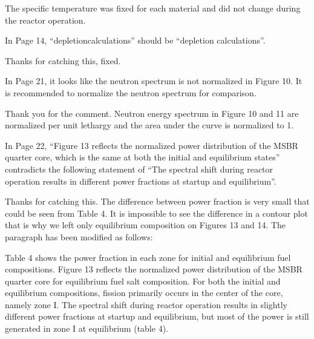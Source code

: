 \documentclass[answers,11pt]{exam}
\begin{document}
\begin{questions}
\begin{solution}
		        The specific temperature was fixed for each material and did 
		        not change during the reactor operation. 
        \end{solution}

        \question  In Page 14, ``depletioncalculations'' should be ``depletion 
        calculations''.
        \begin{solution}
                Thanks for catching this, fixed.
        \end{solution}

        \question  In Page 21, it looks like the neutron spectrum is not 
        normalized in Figure 10. It is recommended to normalize the neutron 
        spectrum for comparison.
        \begin{solution}
                Thank you for the comment. Neutron energy spectrum in Figure 
                10 and 11 are normalized per unit lethargy and the area under 
                the curve is normalized to 1.
        \end{solution}

        \question  In Page 22, ``Figure 13 reflects the normalized power 
        distribution of the MSBR quarter core, which is the same at both the 
        initial and equilibrium states'' contradicts the following statement of 
        ``The spectral shift during reactor operation results in different power 
        fractions at startup and equilibrium''.
        \begin{solution}
                Thanks for catching this. The difference between power fraction
                 is very small that could be seen from Table 4. It is impossible
                  to see the difference in a contour plot that is why we left only 
                 equilibrium composition on Figures 13 and 14. The paragraph has 
                 been modified as follows:
                 
                 Table 4 shows the power fraction in each zone for initial and 
                 equilibrium fuel compositions. Figure 13 reflects the normalized 
                 power distribution of the MSBR quarter core for equilibrium 
                 fuel salt composition. For both the initial and equilibrium 
                 compositions, fission primarily occurs in the center of the core, 
                 namely zone I. The spectral shift during reactor operation results 
                 in slightly different power fractions at startup and equilibrium, 
                 but most of the power is still generated in zone I at equilibrium 
				 (table 4).                  
                   

\end{solution}
\end{questions}
\end{document}
